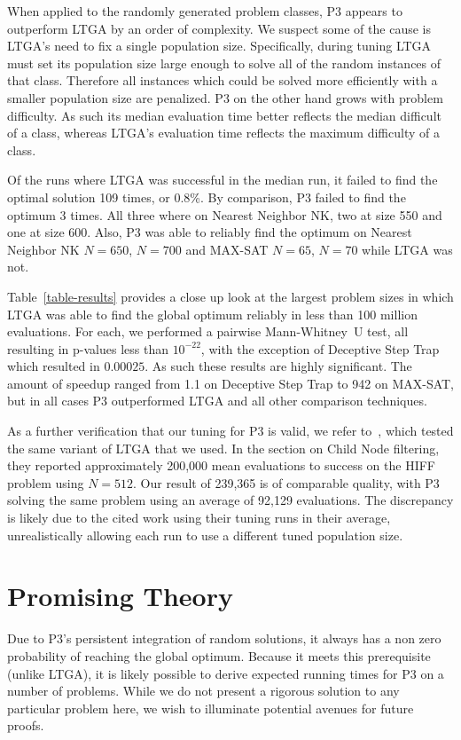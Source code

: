 \documentclass{sig-alternate}
\begin{document}
When applied to the randomly generated problem classes, P3 appears to outperform LTGA
by an order of complexity.  We suspect some of the cause is LTGA's need to fix
a single population size.  Specifically, during tuning LTGA must set its population
size large enough to solve all of the random instances of that class.  Therefore
all instances which could be solved more efficiently with a smaller population size
are penalized.  P3 on the other hand grows with problem difficulty.  As such its
median evaluation time better reflects the median difficult of a class, whereas LTGA's
evaluation time reflects the maximum difficulty of a class.

Of the runs where LTGA was successful in the median run, it failed to find the optimal solution
109 times, or 0.8\%.  By comparison, P3 failed to find the optimum 3 times.  All three
where on Nearest Neighbor NK, two at size 550 and one at size 600.  Also, P3 was able
to reliably find the optimum on Nearest Neighbor NK $N=650$, $N=700$ and MAX-SAT $N=65$, $N=70$
while LTGA was not.

Table~\ref{table-results} provides a close up look at the largest problem sizes
in which LTGA was able to find the global optimum reliably in less than 100 million
evaluations.  For each, we performed a pairwise Mann-Whitney~U test, all resulting
in p-values less than $10^{-22}$, with the exception of Deceptive Step Trap which
resulted in $0.00025$.  As such these results are highly significant.  The amount
of speedup ranged from 1.1 on Deceptive Step Trap to 942 on MAX-SAT, but in all
cases P3 outperformed LTGA and all other comparison techniques.

As a further verification that our tuning for P3 is valid, we refer
to~\cite{thierens:2013:ltgahiff}, which tested the same variant of LTGA that we
used.  In the section on Child Node filtering, they reported approximately 200,000
mean evaluations to success on the HIFF problem using $N=512$.  Our result of
239,365 is of comparable quality, with P3 solving the same problem using an average
of 92,129 evaluations.  The discrepancy is likely due to the cited work using
their tuning runs in their average, unrealistically allowing each run to use a different tuned population size.

\section{Promising Theory}
Due to P3's persistent integration of random solutions, it always has a non zero
probability of reaching the global optimum.  Because it meets this prerequisite
(unlike LTGA), it is likely possible to derive expected running times for P3 on
a number of problems.  While we do not present a rigorous solution to any particular
problem here, we wish to illuminate potential avenues for future proofs.
\end{document}
